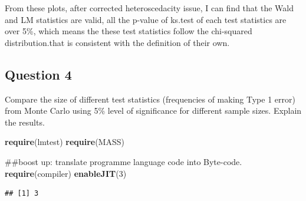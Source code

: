 \documentclass[]{article}
\newenvironment{Shaded}{\begin{snugshade}}{\end{snugshade}}
\newcommand{\KeywordTok}[1]{\textcolor[rgb]{0.13,0.29,0.53}{\textbf{{#1}}}}
\newcommand{\DecValTok}[1]{\textcolor[rgb]{0.00,0.00,0.81}{{#1}}}
\newcommand{\CommentTok}[1]{\textcolor[rgb]{0.56,0.35,0.01}{\textit{{#1}}}}
\newcommand{\NormalTok}[1]{{#1}}
\begin{document}
\begin{Shaded}
\end{Shaded}

From these plots, after corrected heteroscedacity issue, I can find that
the Wald and LM statistics are valid, all the p-value of ks.test of each
test statistics are over 5\%, which means the these test statistics
follow the chi-squared distribution.that is consistent with the
definition of their own.

\subsection{Question 4}\label{question-4}

Compare the size of different test statistics (frequencies of making
Type 1 error) from Monte Carlo using 5\% level of significance for
different sample sizes. Explain the results.

\begin{Shaded}
\begin{Highlighting}[]
\KeywordTok{require}\NormalTok{(lmtest)}
\KeywordTok{require}\NormalTok{(MASS)}


\NormalTok{##boost up: translate programme language code into Byte-code.}
\KeywordTok{require}\NormalTok{(compiler)}
\KeywordTok{enableJIT}\NormalTok{(}\DecValTok{3}\NormalTok{)}
\end{Highlighting}
\end{Shaded}

\begin{verbatim}
## [1] 3
\end{verbatim}
\end{document}
